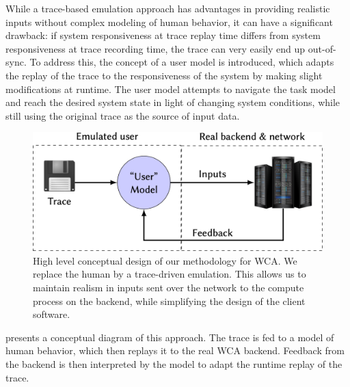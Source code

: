 While a trace-based emulation approach has advantages in providing realistic inputs without complex modeling of human behavior, it can have a significant drawback:
if system responsiveness at trace replay time differs from system responsiveness at trace recording time, the trace can very easily end up out-of-sync.
To address this, the concept of a user model is introduced, which adapts the replay of the trace to the responsiveness of the system by making slight modifications at runtime.
The user model attempts to navigate the task model and reach the desired system state in light of changing system conditions, while still using the original trace as the source of input data.

\begin{figure}
    \centering
    \includegraphics[width=.9\textwidth]{Figs/trace_edgedroid}
    \caption{%
        High level conceptual design of our methodology for \gls{WCA}.
        We replace the human by a trace-driven emulation.
        This allows us to maintain realism in inputs sent over the network to the compute process on the backend, while simplifying the design of the client software.
    }\label{fig:methodology:wca:conceptual}
\end{figure}

 presents a conceptual diagram of this approach.
The trace is fed to a model of human behavior, which then replays it to the real \gls{WCA} backend.
Feedback from the backend is then interpreted by the model to adapt the runtime replay of the trace.


